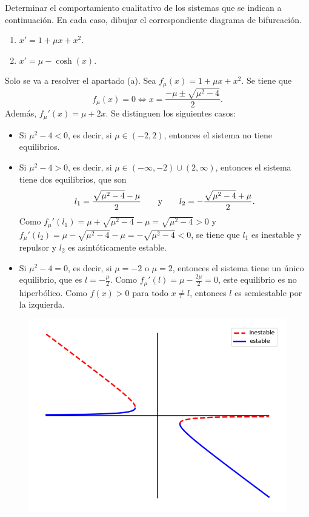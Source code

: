 \documentclass[11pt]{report}
\begin{document}
\begin{exercise}
    Determinar el comportamiento cualitativo de los sistemas que se indican a continuación. En cada caso, dibujar el correspondiente diagrama de bifurcación.
    \begin{enumerate}
        \item $x'=1+\mu x + x^2$.
        \item $x' = \mu - \cosh(x)$.
    \end{enumerate}
\end{exercise}

\begin{solution}
    Solo se va a resolver el apartado (a). Sea $f_\mu(x) = 1+\mu x + x^2$. Se tiene que
    \[f_\mu(x) = 0 \iff x = \frac{-\mu\pm \sqrt{\mu^2-4}}{2}.\]
    Además, $f_\mu'(x) = \mu+2x$. Se distinguen los siguientes casos:
    \begin{itemize}
        \item Si $\mu^2-4 < 0$, es decir, si $\mu \in (-2,2)$, entonces el sistema no tiene equilibrios.
        \item Si $\mu^2-4 > 0$, es decir, si $\mu \in (-\infty,-2)\cup(2,\infty)$, entonces el sistema tiene dos equilibrios, que son \[l_1 = \frac{\sqrt{\mu^2-4}-\mu}{2} \qquad \textup{y} \qquad l_2 = -\frac{\sqrt{\mu^2-4}+\mu}{2}.\] Como $f_\mu'(l_1) = \mu +\sqrt{\mu^2-4}-\mu =\sqrt{\mu^2-4} > 0$ y $f_\mu'(l_2) = \mu -\sqrt{\mu^2-4}-\mu =  -\sqrt{\mu^2-4} < 0$, se tiene que $l_1$ es inestable y repulsor y $l_2$ es asintóticamente estable.
        \item Si $\mu^2-4 = 0$, es decir, si $\mu = -2$ o $\mu = 2$, entonces el sistema tiene un único equilibrio, que es $l = -\frac{\mu}{2}$. Como $f_\mu'(l) = \mu -\frac{2\mu}{2} = 0$, este equilibrio es no hiperbólico. Como $f(x) > 0$ para todo $x \neq l$, entonces $l$ es semiestable por la izquierda.
    \end{itemize}
    \begin{figure}[H]
        \centering
        \includegraphics[scale=0.5]{img/5.png}
    \end{figure}
\end{solution}
\end{document}
